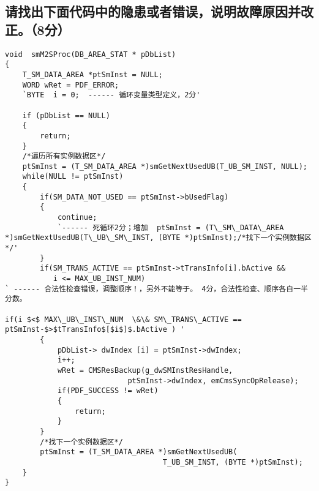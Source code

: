 ﻿\documentclass  [11pt,onecolumn,a4paper]{article}
\begin{document}
\subsection{请找出下面代码中的隐患或者错误，说明故障原因并改正。（8分）}
\begin{lstlisting}[escapeinside=`']
void  smM2SProc(DB_AREA_STAT * pDbList)
{
    T_SM_DATA_AREA *ptSmInst = NULL;
    WORD wRet = PDF_ERROR;
    `BYTE  i = 0;  ------ 循环变量类型定义，2分'

    if (pDbList == NULL)
    {
        return;
    }
    /*遍历所有实例数据区*/	
    ptSmInst = (T_SM_DATA_AREA *)smGetNextUsedUB(T_UB_SM_INST, NULL);	
    while(NULL != ptSmInst)
    {
        if(SM_DATA_NOT_USED == ptSmInst->bUsedFlag)
        {
            continue;
            `------ 死循环2分；增加  ptSmInst = (T\_SM\_DATA\_AREA *)smGetNextUsedUB(T\_UB\_SM\_INST, (BYTE *)ptSmInst);/*找下一个实例数据区*/'
        }	 
        if(SM_TRANS_ACTIVE == ptSmInst->tTransInfo[i].bActive &&
           i <= MAX_UB_INST_NUM)   
` ------ 合法性检查错误，调整顺序！，另外不能等于。 4分，合法性检查、顺序各自一半分数。

if(i $<$ MAX\_UB\_INST\_NUM  \&\& SM\_TRANS\_ACTIVE == ptSmInst-$>$tTransInfo$[$i$]$.bActive ) '
        {            
            pDbList-> dwIndex [i] = ptSmInst->dwIndex;
            i++; 
            wRet = CMSResBackup(g_dwSMInstResHandle,
                            ptSmInst->dwIndex, emCmsSyncOpRelease);
            if(PDF_SUCCESS != wRet)
            {
                return;
            }
        }
        /*找下一个实例数据区*/
        ptSmInst = (T_SM_DATA_AREA *)smGetNextUsedUB(
                                    T_UB_SM_INST, (BYTE *)ptSmInst);
    }
}
\end{lstlisting}
\end{document}
